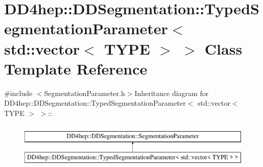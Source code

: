\hypertarget{class_d_d4hep_1_1_d_d_segmentation_1_1_typed_segmentation_parameter_3_01std_1_1vector_3_01_t_y_p_e_01_4_01_4}{
\section{DD4hep::DDSegmentation::TypedSegmentationParameter$<$ std::vector$<$ TYPE $>$ $>$ Class Template Reference}
\label{class_d_d4hep_1_1_d_d_segmentation_1_1_typed_segmentation_parameter_3_01std_1_1vector_3_01_t_y_p_e_01_4_01_4}
}


{\ttfamily \#include $<$SegmentationParameter.h$>$}Inheritance diagram for DD4hep::DDSegmentation::TypedSegmentationParameter$<$ std::vector$<$ TYPE $>$ $>$::\begin{figure}[H]
\begin{center}
\leavevmode
\includegraphics[height=2cm]{class_d_d4hep_1_1_d_d_segmentation_1_1_typed_segmentation_parameter_3_01std_1_1vector_3_01_t_y_p_e_01_4_01_4}
\end{center}
\end{figure}
